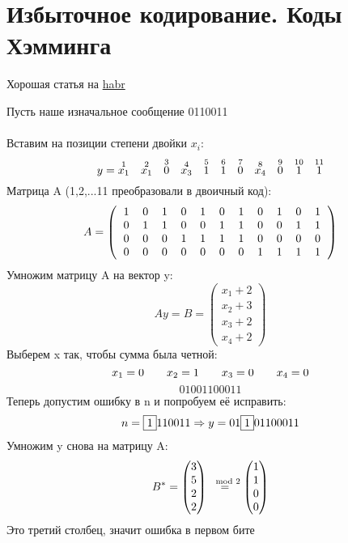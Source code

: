\documentclass[discrete.tex]{subfiles}
\begin{document}
  \section{Избыточное кодирование. Коды Хэмминга}
  Хорошая статья на \href{https://habr.com/ru/post/140611/}{habr}

  \begin{sol}[по Григорьевой]
    Пусть наше изначальное сообщение 0110011\\ \ \\
    Вставим на позиции степени двойки $x_i$:\\
    \[y = \overset{1}{x_1} \quad \overset{2}{x_1} \quad \overset{3}{0} \quad \overset{4}{x_3} \quad \overset{5}{1} \quad \overset{6}{1} \quad \overset{7}{0} \quad \overset{8}{x_4} \quad \overset{9}{0} \quad  \overset{10}{1} \quad  \overset{11}{1}\]
    Матрица A (1,2,...11 преобразовали в двоичный код):
    \[A = \left(\begin{tabular}{ccccccccccc}
      1 & 0 & 1 & 0 & 1 & 0 & 1 & 0 & 1 & 0 & 1\\
      0 & 1 & 1 & 0 & 0 & 1 & 1 & 0 & 0 & 1 & 1\\
      0 & 0 & 0 & 1 & 1 & 1 & 1 & 0 & 0 & 0 & 0\\
      0 & 0 & 0 & 0 & 0 & 0 & 0 & 1 & 1 & 1 & 1
    \end{tabular}\right)\]
    Умножим матрицу A на вектор y:
    \[A y = B = \begin{pmatrix}
      x_1 + 2\\
      x_2 + 3\\
      x_3 + 2\\
      x_4 + 2
    \end{pmatrix}\]
    Выберем x так, чтобы сумма была четной:
    \[x_1 = 0 \qquad x_2 = 1 \qquad x_3 = 0 \qquad x_4 = 0\]
    \[01001100011\]
    Теперь допустим ошибку в n и попробуем её исправить:
    \[n = \fbox{1}110011 \Rightarrow y = 01\fbox{1}01100011\]
    Умножим y снова на матрицу A:
    \[B^* = \begin{pmatrix}
      3\\5\\2\\2
    \end{pmatrix} \overset{\mod 2}{=} \begin{pmatrix}
      1\\1\\0\\0
    \end{pmatrix}\]
    Это третий столбец, значит ошибка в первом бите
  \end{sol}
\end{document}
